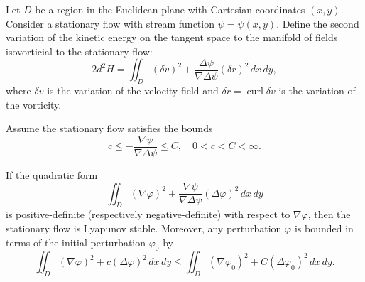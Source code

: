 Let $D$ be a region in the Euclidean plane with Cartesian coordinates $(x, y)$. Consider a stationary flow with stream function $\psi = \psi(x, y)$. Define the second variation of the kinetic energy on the tangent space to the manifold of fields isovorticial to the stationary flow:
$$2 d^2 H = \iint_D (\delta v)^2 + \frac{\Delta \psi}{\nabla \Delta \psi} (\delta r)^2 \, dx \, dy,$$
where $\delta v$ is the variation of the velocity field and $\delta r = \operatorname{curl} \delta v$ is the variation of the vorticity.

Assume the stationary flow satisfies the bounds
$$c \leq -\frac{\nabla \psi}{\nabla \Delta \psi} \leq C, \quad 0 < c < C < \infty.$$

If the quadratic form
$$\iint_D (\nabla \varphi)^2 + \frac{\nabla \psi}{\nabla \Delta \psi} (\Delta \varphi)^2 \, dx \, dy$$
is positive-definite (respectively negative-definite) with respect to $\nabla \varphi$, then the stationary flow is Lyapunov stable. Moreover, any perturbation $\varphi$ is bounded in terms of the initial perturbation $\varphi_0$ by
$$\iint_D (\nabla \varphi)^2 + c (\Delta \varphi)^2 \, dx \, dy \leq \iint_D (\nabla \varphi_0)^2 + C (\Delta \varphi_0)^2 \, dx \, dy.$$
